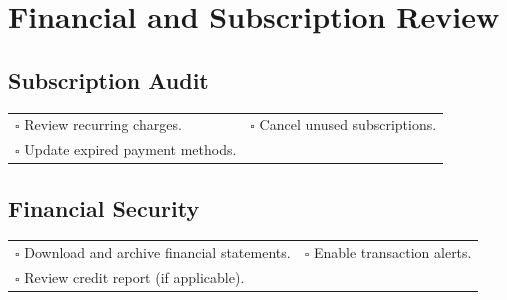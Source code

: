 
\section{Financial and Subscription Review}
\label{sec:finance}

\subsection{Subscription Audit}

\begin{tabular}{p{9cm} p{8cm}}
$\square$ Review recurring charges. & $\square$ Cancel unused subscriptions. \\ 
$\square$ Update expired payment methods. & \\ 
\end{tabular}

\subsection{Financial Security}

\begin{tabular}{p{9cm} p{8cm}}
$\square$ Download and archive financial statements. & $\square$ Enable transaction alerts. \\ 
$\square$ Review credit report (if applicable). & \\ 
\end{tabular}

